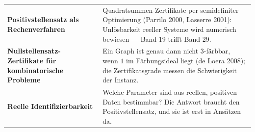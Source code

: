 \begin{forschung}
\begin{center}
{\small
\renewcommand{\arraystretch}{1.45}
\begin{tabular}{@{}P{3.0cm}P{5.2cm}@{}}
\toprule
\textbf{Positivstellensatz als Rechenverfahren} & Quadratsummen-Zertifikate per semidefiniter Optimierung (Parrilo 2000, Lasserre 2001): Unlösbarkeit reeller Systeme wird numerisch bewiesen --- Band 19 trifft Band 29.\\
\textbf{Nullstellensatz-Zertifikate für kombinatorische Probleme} & Ein Graph ist genau dann nicht 3-färbbar, wenn $1$ im Färbungsideal liegt (de Loera 2008); die Zertifikatsgrade messen die Schwierigkeit der Instanz.\\
\textbf{Reelle Identifizierbarkeit} & Welche Parameter sind aus reellen, positiven Daten bestimmbar? Die Antwort braucht den Positivstellensatz, und sie ist erst in Ansätzen da.\\
\bottomrule
\end{tabular}}
\end{center}

\begin{center}
\begin{minipage}{0.88\textwidth}
\end{minipage}
\end{center}
\end{forschung}

